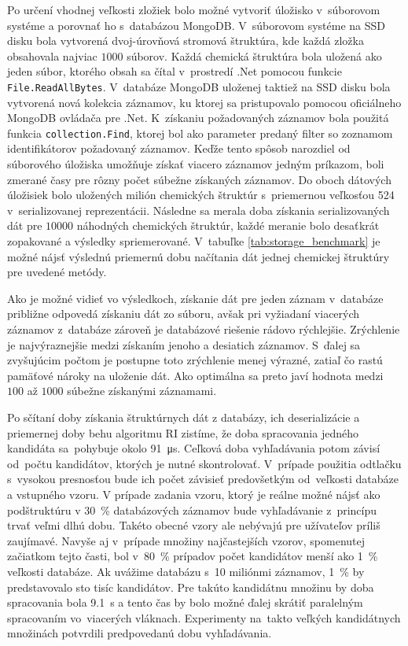 \documentclass[slovak]{ExcelAtFIT} %
\begin{document}
Po určení vhodnej veľkosti zložiek bolo možné vytvoriť úložisko v~súborovom systéme a porovnať ho s~databázou MongoDB. V~súborovom systéme na SSD disku bola vytvorená dvoj-úrovňová stromová štruktúra, kde každá zložka obsahovala najviac $1000$ súborov. Každá chemická štruktúra bola uložená ako jeden súbor, ktorého obsah sa čítal v~prostredí .Net pomocou funkcie \texttt{File.ReadAllBytes}. V~databáze MongoDB uloženej taktiež na SSD disku bola vytvorená nová kolekcia záznamov, ku ktorej sa pristupovalo pomocou oficiálneho MongoDB ovládača pre .Net. K~získaniu požadovaných záznamov bola použitá funkcia \texttt{collection.Find}, ktorej bol ako parameter predaný filter so zoznamom identifikátorov požadovaný záznamov. Keďže tento spôsob narozdiel od súborového úložiska umožňuje získať viacero záznamov jedným príkazom, boli zmerané časy pre rôzny počet súbežne získaných záznamov. Do oboch dátových úložisiek bolo uložených milión chemických štruktúr s~priemernou veľkosťou \SI{524}{\byte} v~serializovanej reprezentácii. Následne sa merala doba získania serializovaných dát pre $10000$ náhodných chemických štruktúr, každé meranie bolo desaťkrát zopakované a výsledky spriemerované. V~tabuľke \ref{tab:storage_benchmark} je možné nájsť výslednú priemernú dobu načítania dát jednej chemickej štruktúry pre uvedené metódy.

Ako je možné vidieť vo výsledkoch, získanie dát pre jeden záznam v~databáze približne odpovedá zí\-ska\-niu dát zo súboru, avšak pri vyžiadaní viacerých záznamov z~databáze zároveň je databázové riešenie rádovo rý\-chlej\-šie. Zrýchlenie je najvýraznejšie medzi získaním jenoho a desiatich záznamov. S~ďalej sa zvyšujúcim počtom je postupne toto zrýchlenie menej výrazné, zatiaľ čo rastú pamäťové nároky na uloženie dát. Ako optimálna sa preto javí hodnota medzi $100$ až $1000$ súbežne získanými záznamami.

Po sčítaní doby získania štruktúrnych dát z databázy, ich deserializácie a priemernej doby behu algoritmu RI zistíme, že doba spracovania jedného kandidáta sa~pohybuje okolo \SI{91}{\micro\second}. Ceľková doba vy\-hľa\-dá\-va\-nia potom závisí od~počtu kandidátov, ktorých je nutné skontrolovať. V~prípade použitia odtlačku s~vysokou presnosťou bude ich počet závisieť predovšetkým od~veľ\-ko\-sti databáze a vstupného vzoru. V prípade zadania vzoru, ktorý je reálne možné nájsť ako podštruktúru v \SI{30}{\percent} databázových záznamov bude vyhľadávanie z~prin\-cí\-pu trvať veľmi dlhú dobu. Takéto obecné vzory ale ne\-bý\-va\-jú pre užívateľov príliš za\-u\-jí\-ma\-vé. Navyše aj v~prípade množiny najčastejších vzorov, spomenutej začiatkom tejto časti, bol v~\SI{80}{\percent} prípadov počet kandidátov menší ako \SI{1}{\percent} veľkosti databáze. Ak uvážime databázu s~10 miliónmi záznamov, \SI{1}{\percent} by predstavovalo sto tisíc kandidátov. Pre takúto kandidátnu mno\-ži\-nu by doba spracovania bola \SI{9.1}{\second} a tento čas by bolo možné ďalej skrátiť paralelným spracovaním vo~viacerých vláknach. Experimenty na~takto veľkých kandidátnych množinách potvrdili predpovedanú dobu vyhľadávania. 
\end{document}
